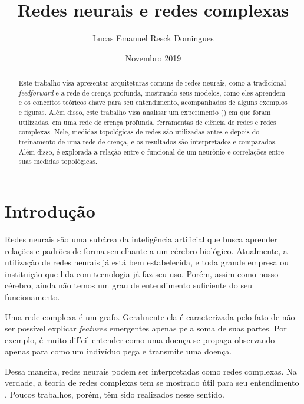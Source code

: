 \documentclass{article}
\title{Redes neurais e redes complexas}
\author{Lucas Emanuel Resck Domingues}
\date{Novembro 2019}
\begin{document}
    \maketitle

    \begin{abstract}
        Este trabalho visa apresentar arquiteturas comuns de redes neurais, como a tradicional \textit{feedforward} e a rede de crença profunda, mostrando seus modelos, como eles aprendem e os conceitos teóricos chave para seu entendimento, acompanhados de alguns exemplos e figuras.
        Além disso, este trabalho visa analisar um experimento (\cite{testolin2018deep}) em que foram utilizadas, em uma rede de crença profunda, ferramentas de ciência de redes e redes complexas.
        Nele, medidas topológicas de redes são utilizadas antes e depois do treinamento de uma rede de crença, e os resultados são interpretados e comparados.
        Além disso, é explorada a relação entre o funcional de um neurônio e correlações entre suas medidas topológicas.
    \end{abstract}
    
    \newpage

    \tableofcontents

    \newpage

    \section{Introdução}

        Redes neurais são uma subárea da inteligência artificial que busca aprender relações e padrões de forma semelhante a um cérebro biológico.
        Atualmente, a utilização de redes neurais já está bem estabelecida, e toda grande empresa ou instituição que lida com tecnologia já faz seu uso.
        Porém, assim como nosso cérebro, ainda não temos um grau de entendimento suficiente do seu funcionamento.

        Uma rede complexa é um grafo.
        Geralmente ela é caracterizada pelo fato de não ser possível explicar \textit{features} emergentes apenas pela soma de suas partes.
        Por exemplo, é muito difícil entender como uma doença se propaga observando apenas para como um indivíduo pega e transmite uma doença.
        
        Dessa maneira, redes neurais podem ser interpretadas como redes complexas.
        Na verdade, a teoria de redes complexas tem se mostrado útil para seu entendimento \cite{galhardo2006redes}.
        Poucos trabalhos, porém, têm sido realizados nesse sentido.
\end{document}
